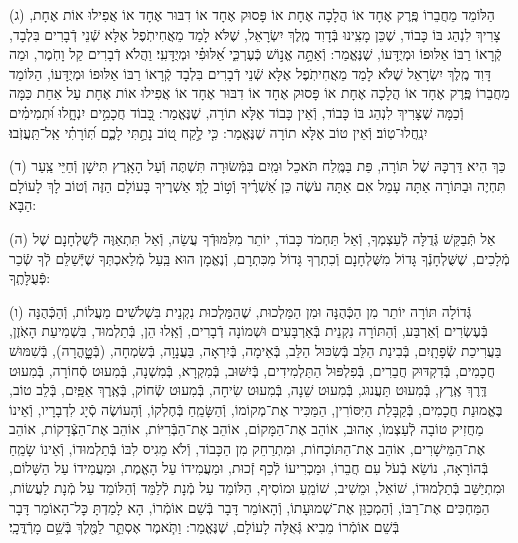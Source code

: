 \documentclass[twoside, openany, parskip=half, 11pt]{book}
\begin{document}
(ג)
הַלּוֹמֵד מֵחֲבֵרוֹ פֶּֽרֶק אֶחָד אוֹ הֲלָכָה אֶחָת אוֹ פָּסוּק אֶחָד אוֹ דִבּוּר אֶחָד אוֹ אֲפִילוּ אוֹת אֶחָת, צָרִיךְ לִנְהַג בּוֹ כָּבוֹד, שֶׁכֵּן מָצִֽינוּ בְּֿדָוִד מֶֽלֶךְ יִשְׂרָאֵל, שֶׁלֹּא לָמַד מֵאֲחִיתֹֽפֶל אֶלָּא שְֿׁנֵי דְֿבָרִים בִּלְבָד, קְֿרָאוֹ רַבּוֹ אַלּוּפוֹ וּמְיֻדָּעוֹ, שֶׁנֶּאֱמַר:  וְֿאַתָּ֣ה אֱנ֣וֹשׁ כְּֿעֶרְכִּ֑י אַ֝לּוּפִ֗י וּמְיֻדָּעִֽי׃ וַהֲלֹא דְֿבָרִים קַל וָחֹֽמֶר, וּמַה דָּוִד מֶֽלֶךְ יִשְׂרָאֵל שֶׁלֹּא לָמַד מֵאֲחִיתֹֽפֶל אֶלָּא שְֿׁנֵי דְֿבָרִים בִּלְבָד קְֿרָאוֹ רַבּוֹ אַלּוּפוֹ וּמְיֻדָּעוֹ, הַלּוֹמֵד מֵחֲבֵרוֹ פֶּֽרֶק אֶחָד אוֹ הֲלָכָה אֶחָת אוֹ פָּסוּק אֶחָד אוֹ דִבּוּר אֶחָד אוֹ אֲפִילוּ אוֹת אֶחָת עַל אַחַת כַּמָּה וְֿכַמָּה שֶׁצָּרִיךְ לִנְהַג בּוֹ כָּבוֹד, וְֿאֵין כָּבוֹד אֶלָּא תוֹרָה, שֶׁנֶּאֱמַר: כָּ֭בוֹד חֲכָמִ֣ים יִנְחָ֑לוּ וּ֝תְמִימִ֗ים יִנְֽחֲלוּ־טֽוֹב׃ וְֿאֵין טוֹב אֶלָּא תוֹרָה שֶׁנֶּאֱמַר: כִּ֤י לֶ֣קַח ט֭וֹב נָתַ֣תִּי לָכֶ֑ם תּֽ֝וֹרָתִ֗י אַֽל־תַּֽעֲזֹֽבוּ׃

(ד)
כַּךְ הִיא דַּרְכָּהּ שֶׁל תּוֹרָה, פַּת בַּמֶּֽלַח תֹּאכֵל וּמַֽיִם בִּמְּֿשׂוּרָה תִּשְׁתֶּה וְֿעַל הָאָֽרֶץ תִּישָׁן וְֿחַיֵּי צַֽעַר תִּחְיֶה וּבַתּוֹרָה אַתָּה עָמֵל אִם אַתָּה עֹשֶׂה כֵּן אַ֝שְׁרֶ֗יךָ וְֿט֣וֹב לָֽךְ׃ אַשְׁרֶיךָ בָּעוֹלָם הַזֶּה וְֿטוֹב לָךְ לָעוֹלָם הַבָּא:

(ה)
אַל תְּֿבַקֵּשׁ גְּֿדֻלָּה לְֿעַצְמְךָ, וְֿאַל תַּחְמֹד כָּבוֹד, יוֹתֵר מִלִּמּוּדְֿךָ עֲשֵׂה, וְֿאַל תִּתְאַוֶּה לְֿשֻׁלְחָנָם שֶׁל מְֿלָכִים, שֶׁשֻּׁלְחָנְֿךָ גָּדוֹל מִשֻּׁלְחָנָם וְֿכִתְרְךָ גָּדוֹל מִכִּתְרָם, וְֿנֶאֱמָן הוּא בַּֽעַל מְֿלַאכְתְּךָ שֶׁיְּֿשַׁלֵּם לְֿךָ שְֿׂכַר פְּֿעֻלָּתֶֽךָ:

(ו)
גְּֿדוֹלָה תּוֹרָה יוֹתֵר מִן הַכְּֿהֻנָּה וּמִן הַמַּלְכוּת, שֶׁהַמַּלְכוּת נִקְנֵית בִּשְׁלֹֹשִׁים מַעֲלוֹת, וְֿהַכְּֿהֻנָּה בְּֿעֶשְׂרִים וְֿאַרְבַּע, וְֿהַתּוֹרָה נִקְנֵית בְּֿאַרְבָּעִים וּשְׁמוֹנָה דְֿבָרִים, וְֿאֵֽלוּ הֵן, בְּֿתַלְמוּד, בִּשְׁמִיעַת הָאֹֽזֶן, בַּעֲרִיכַת שְֿׂפָתָֽיִם, בְּֿבִינַת הַלֵּב בְּֿשִׂכּוּל הַלֵּב, בְּֿאֵימָה, בְּֿיִרְאָה, בַּעֲנָוָה, בְּֿשִׂמְחָה, (בְּֿטׇׇׇׇׇׇָהֳרָה), בְּֿשִׁמּוּשׁ חֲכָמִים, בְּֿדִקְדּוּק חֲבֵרִים, בְּֿפִלְפּוּל הַתַּלְמִידִים, בְּֿיִשּׁוּב, בְּֿמִקְרָא, בְּֿמִשְׁנָה, בְּֿמִעוּט סְֿחוֹרָה, בְּֿמִעוּט דֶּֽרֶךְ אֶֽרֶץ, בְּֿמִעוּט תַּעֲנוּג, בְּֿמִעוּט שֵׁנָה, בְּֿמִעוּט שִׂיחָה, בְּֿמִעוּט שְֿׂחוֹק, בְּֿאֶֽרֶךְ אַפַּֽיִם, בְּֿלֵב טוֹב, בֶּאֱמוּנַת חֲכָמִים, בְּֿקַבָּלַת הַיִּסּוֹרִין, הַמַּכִּיר אֶת־מְקוֹמוֹ, וְֿהַשָּׂמֵֽחַ בְּֿחֶלְקוֹ, וְֿהָעוֹשֶׂה סְֿיָג לִדְבָרָיו, וְֿאֵינוֹ מַחֲזִיק טוֹבָה לְֿעַצְמוֹ, אָהוּב, אוֹהֵב אֶת־הַמָּקוֹם, אוֹהֵב אֶת־הַבְּֿרִיּוֹת, אוֹהֵב אֶת־הַצְּֿדָקוֹת, אוֹהֵב אֶת־הַמֵּישָׁרִים, אוֹהֵב אֶת־הַתּוֹכָחוֹת, וּמִתְרַחֵק מִן הַכָּבוֹד, וְֿלֹא מֵגִיס לִבּוֹ בְּֿתַלְמוּדוֹ, וְֿאֵינוֹ שָׂמֵֽחַ בְּֿהוֹרָאָה, נוֹשֵׂא בְֿעֹל עִם חֲבֵרוֹ, וּמַכְרִיעוֹ לְֿכַף זְֿכוּת, וּמַעֲמִידוֹ עַל הָאֱמֶת, וּמַעֲמִידוֹ עַל הַשָּׁלוֹם, וּמִתְיַשֵּׁב בְּֿתַלְמוּדוֹ, שׁוֹאֵל, וּמֵשִׁיב, שׁוֹמֵֽעַ וּמוֹסִיף, הַלּוֹמֵד עַל מְֿנָת לְֿלַמֵּד וְֿהַלּוֹמֵד עַל מְֿנָת לַעֲשׂוֹת, הַמַּחְכִּים אֶת־רַבּוֹ, וְֿהַמְכַוֵּן אֶת־שְׁמוּעָתוֹ, וְֿהָאוֹמֵר דָּבָר בְּֿשֵׁם אוֹמְֿרוֹ, הָא לָמַדְתָּ כׇּל־הָאוֹמֵר דָּבָר בְּֿשֵׁם אוֹמְֿרוֹ מֵבִיא גְּֿאֻלָּה לָעוֹלָם, שֶׁנֶּאֱמַר:  וַתֹּ֧אמֶר אֶסְתֵּ֛ר לַמֶּ֖לֶךְ בְּֿשֵׁ֥ם מָרְֿדֳּכָֽי׃
\end{document}
